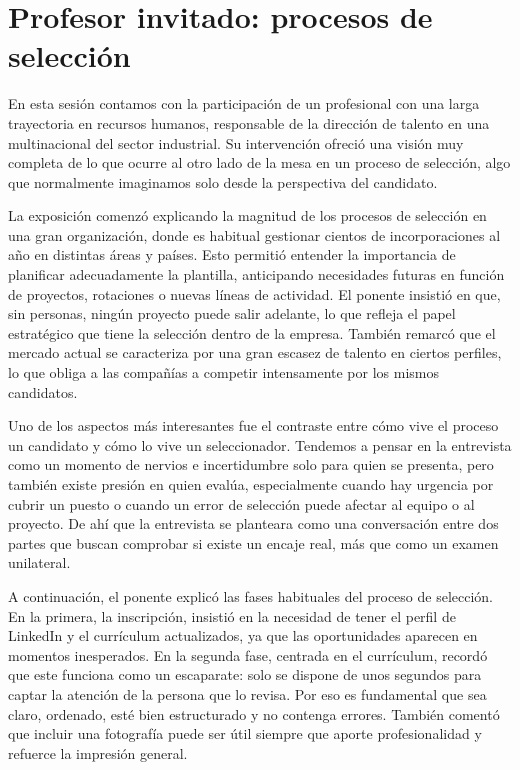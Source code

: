 \chapter{Profesor invitado: procesos de selección}

En esta sesión contamos con la participación de un profesional con una larga trayectoria en recursos humanos, responsable de la dirección de talento en una multinacional del sector industrial. Su intervención ofreció una visión muy completa de lo que ocurre al otro lado de la mesa en un proceso de selección, algo que normalmente imaginamos solo desde la perspectiva del candidato.

La exposición comenzó explicando la magnitud de los procesos de selección en una gran organización, donde es habitual gestionar cientos de incorporaciones al año en distintas áreas y países. Esto permitió entender la importancia de planificar adecuadamente la plantilla, anticipando necesidades futuras en función de proyectos, rotaciones o nuevas líneas de actividad. El ponente insistió en que, sin personas, ningún proyecto puede salir adelante, lo que refleja el papel estratégico que tiene la selección dentro de la empresa. También remarcó que el mercado actual se caracteriza por una gran escasez de talento en ciertos perfiles, lo que obliga a las compañías a competir intensamente por los mismos candidatos.

Uno de los aspectos más interesantes fue el contraste entre cómo vive el proceso un candidato y cómo lo vive un seleccionador. Tendemos a pensar en la entrevista como un momento de nervios e incertidumbre solo para quien se presenta, pero también existe presión en quien evalúa, especialmente cuando hay urgencia por cubrir un puesto o cuando un error de selección puede afectar al equipo o al proyecto. De ahí que la entrevista se planteara como una conversación entre dos partes que buscan comprobar si existe un encaje real, más que como un examen unilateral.

A continuación, el ponente explicó las fases habituales del proceso de selección. En la primera, la inscripción, insistió en la necesidad de tener el perfil de LinkedIn y el currículum actualizados, ya que las oportunidades aparecen en momentos inesperados. En la segunda fase, centrada en el currículum, recordó que este funciona como un escaparate: solo se dispone de unos segundos para captar la atención de la persona que lo revisa. Por eso es fundamental que sea claro, ordenado, esté bien estructurado y no contenga errores. También comentó que incluir una fotografía puede ser útil siempre que aporte profesionalidad y refuerce la impresión general.

